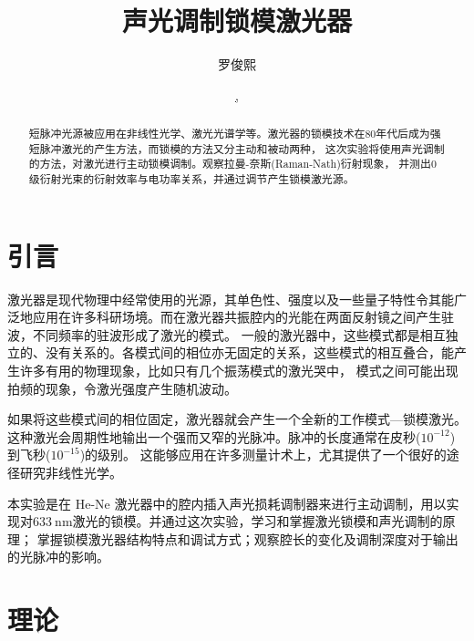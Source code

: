 \documentclass[font=default]{mpltx}
\makeatletter
\newcommand\releasedate{%
    \href{https://github.com/CastleStar14654/PKUMpLtX/releases/tag/\mpltx@fileversion}%
        {\mpltx@filedate, \mpltx@fileversion}}
\makeatother
\begin{document}
\title{声光调制锁模激光器} %
\author{罗俊熙} %
\date{\releasedate}
\begin{abstract}
	短脉冲光源被应用在非线性光学、激光光谱学等。激光器的锁模技术在80年代后成为强短脉冲激光的产生方法，而锁模的方法又分主动和被动两种，
    这次实验将使用声光调制的方法，对激光进行主动锁模调制。观察拉曼-奈斯(Raman-Nath)衍射现象，
    并测出0级衍射光束的衍射效率与电功率关系，并通过调节产生锁模激光源。
\end{abstract}

\maketitle

\section{引言}
激光器是现代物理中经常使用的光源，其单色性、强度以及一些量子特性令其能广泛地应用在许多科研场境。而在激光器共振腔内的光能在两面反射镜之间产生驻波，不同频率的驻波形成了激光的模式。
一般的激光器中，这些模式都是相互独立的、没有关系的。各模式间的相位亦无固定的关系，这些模式的相互叠合，能产生许多有用的物理现象，比如只有几个振荡模式的激光哭中，
模式之间可能出现拍频的现象，令激光强度产生随机波动。\par

如果将这些模式间的相位固定，激光器就会产生一个全新的工作模式—锁模激光。这种激光会周期性地输出一个强而又窄的光脉冲。脉冲的长度通常在皮秒($10^{-12}$)到飞秒($10^{-15}$)的级别。
这能够应用在许多测量计术上，尤其提供了一个很好的途径研究非线性光学。\par

本实验是在 He-Ne 激光器中的腔内插入声光损耗调制器来进行主动调制，用以实现对$\qty{633}{\nm}$激光的锁模。并通过这次实验，学习和掌握激光锁模和声光调制的原理；
掌握锁模激光器结构特点和调试方式；观察腔长的变化及调制深度对于输出的光脉冲的影响。

\section{理论}\label{sec:theory}
\end{document}
